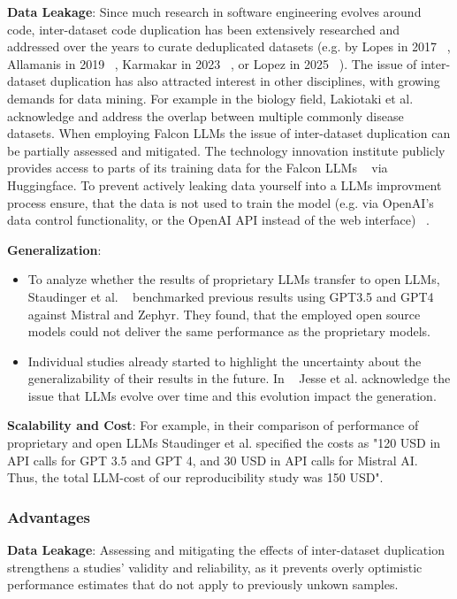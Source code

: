 \textbf{Data Leakage}:
Since much research in software engineering evolves around code, inter-dataset code duplication has been extensively researched and addressed over the years to curate deduplicated datasets (e.g. by Lopes in 2017 ~\cite{10.1145/3133908}, Allamanis in 2019 ~\cite{10.1145/3359591.3359735}, Karmakar in 2023 ~\cite{10.1007/s10664-022-10275-7}, or Lopez in 2025 ~\cite{inter-dataset-lopez2025}).
The issue of inter-dataset duplication has also attracted interest in other disciplines, with growing demands for data mining. For example in the biology field, Lakiotaki et al. ~\cite{10.1093/database/bay011} acknowledge and address the overlap between multiple commonly disease datasets. 
When employing Falcon LLMs the issue of inter-dataset duplication can be partially assessed and mitigated. The technology innovation institute publicly provides access to parts of its training data for the Falcon LLMs ~\cite{technology_innovation_institute_2023} via Huggingface.
To prevent actively leaking data yourself into a LLMs improvment process ensure, that the data is not used to train the model (e.g. via OpenAI's data control functionality, or the OpenAI API instead of the web interface) ~\cite{balloccu-etal-2024-leak}.

\textbf{Generalization}:
\begin{itemize}
  \item To analyze whether the results of proprietary LLMs transfer to open LLMs, Staudinger et al. ~\cite{10.1145/3673791.3698432} benchmarked previous results using GPT3.5 and GPT4 against Mistral and Zephyr. They found, that the employed open source models could not deliver the same performance as the proprietary models.
  \item Individual studies already started to highlight the uncertainty about the generalizability of their results in the future. In ~\cite{10174227} Jesse et al. acknowledge the issue that LLMs evolve over time and this evolution impact the generation.
\end{itemize}

\textbf{Scalability and Cost}:
For example, in their comparison of performance of proprietary and open LLMs Staudinger et al. specified the costs as "120 USD in API calls for GPT 3.5 and GPT 4, and 30 USD in API calls for Mistral AI. Thus, the total LLM-cost of our reproducibility study was 150 USD". ~\cite{10.1145/3673791.3698432}


\subsubsection{Advantages}
\textbf{Data Leakage}:
Assessing and mitigating the effects of inter-dataset duplication strengthens a studies' validity and reliability, as it prevents overly optimistic performance estimates that do not apply to previously unkown samples.

